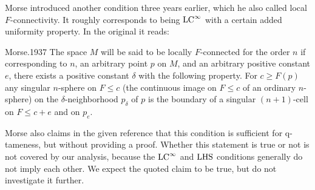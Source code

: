 \begin{rem}
Morse introduced another condition three years earlier, which he also called local $F$-connectivity.
It roughly corresponds to being $\mathrm{LC}^\infty$ with a certain added uniformity property.
In the original it reads:
\begin{displaycquote}[p.421--422]{Morse.1937}
	The space $M$ will be said to be locally $F$-connected for the order $n$ if corresponding to $n$, an arbitrary point $p$ on $M$, and an arbitrary positive constant $e$, there exists a positive constant $\delta$ with the following property.
	For $c \geq F(p)$ any singular $n$-sphere on $F \leq c$ (the continuous image on $F \leq c$ of an ordinary $n$-sphere) on the $\delta$-neighborhood $p_{\delta}$ of $p$ is the boundary of a singular $(n + 1)$-cell on $F \leq c + e$ and on $p_e$.
\end{displaycquote}
Morse also claims in the given reference that this condition is sufficient for q-tameness, but without providing a proof.
Whether this statement is true or not is not covered by our analysis, because the $\mathrm{LC}^\infty$ and $\mathrm{LHS}$ conditions generally do not imply each other.
We expect the quoted claim to be true, but do not investigate it further.
\end{rem}